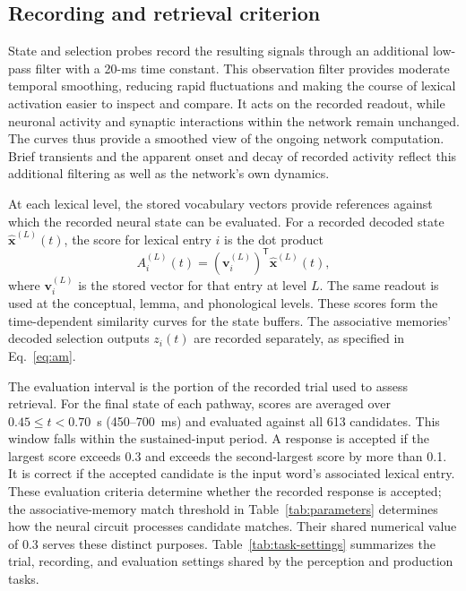 \subsection{Recording and retrieval criterion}
\label{sec:task-evaluation}
State and selection probes record the resulting signals through an additional low-pass filter with a 20-ms time constant. This observation filter provides moderate temporal smoothing, reducing rapid fluctuations and making the course of lexical activation easier to inspect and compare. It acts on the recorded readout, while neuronal activity and synaptic interactions within the network remain unchanged. The curves thus provide a smoothed view of the ongoing network computation. Brief transients and the apparent onset and decay of recorded activity reflect this additional filtering as well as the network's own dynamics.

At each lexical level, the stored vocabulary vectors provide references against which the recorded neural state can be evaluated. For a recorded decoded state $\hat{\mathbf x}^{(L)}(t)$, the score for lexical entry $i$ is the dot product
\begin{equation}
 A_i^{(L)}(t)=(\mathbf v_i^{(L)})^{\mathsf T}\hat{\mathbf x}^{(L)}(t),
 \label{eq:activation}
\end{equation}
where $\mathbf v_i^{(L)}$ is the stored vector for that entry at level $L$. The same readout is used at the conceptual, lemma, and phonological levels. These scores form the time-dependent similarity curves for the state buffers. The associative memories' decoded selection outputs $z_i(t)$ are recorded separately, as specified in Eq.~\eqref{eq:am}.

The evaluation interval is the portion of the recorded trial used to assess retrieval. For the final state of each pathway, scores are averaged over $0.45\leq t<0.70$~s (450--700~ms) and evaluated against all 613 candidates. This window falls within the sustained-input period. A response is accepted if the largest score exceeds 0.3 and exceeds the second-largest score by more than 0.1. It is correct if the accepted candidate is the input word's associated lexical entry. These evaluation criteria determine whether the recorded response is accepted; the associative-memory match threshold in Table~\ref{tab:parameters} determines how the neural circuit processes candidate matches. Their shared numerical value of 0.3 serves these distinct purposes. Table~\ref{tab:task-settings} summarizes the trial, recording, and evaluation settings shared by the perception and production tasks.

